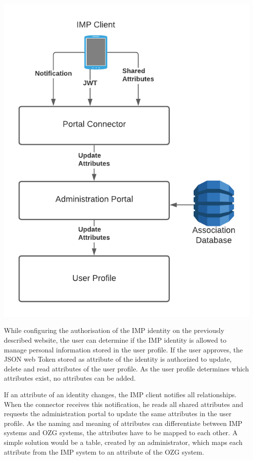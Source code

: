 \documentclass[
     12pt,         %
     a4paper,      %
     BCOR=10mm,version=first,     %
     DIV=14,version=first,        %
     ]{scrreprt}
\begin{document}
\begin{center}
    \includegraphics[scale=0.3]{Diagrams/Integration 1/Personal Information/Overview.png}
\end{center}

While configuring the authorisation of the IMP identity on the previously described website, the user can determine if the IMP identity is allowed to manage personal information stored in the user profile. If the user approves, the JSON web Token stored as attribute of the identity is authorized to update, delete and read attributes of the user profile. As the user profile determines which attributes exist, no attributes can be added.

If an attribute of an identity changes, the IMP client notifies all relationships. When the connector receives this notification, he reads all shared attributes and requests the administration portal to update the same attributes in the user profile. As the naming and meaning of attributes can differentiate between IMP systems and OZG systems, the attributes have to be mapped to each other. A simple solution would be a table, created by an administrator, which maps each attribute from the IMP system to an attribute of the OZG system.
\end{document}
